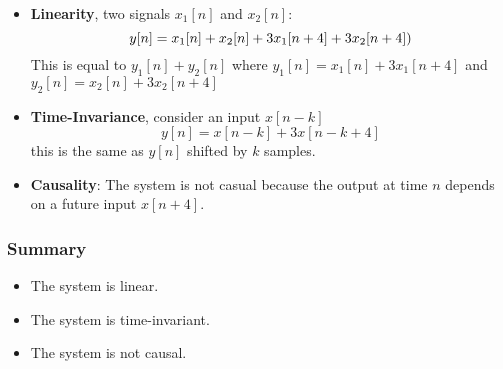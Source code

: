 \begin{itemize}
    \item \textbf{Linearity}, two signals $x_1[n]$ and $x_2[n]$:
    \subitem \begin{equation*} y[n] = x_{1}[n] + x_{2}[n] + 3x_{1}[n+4] + 3x_{2}[n+4])\\
          \end{equation*}
     This is equal to $y_1[n]+y_2[n]$ where $y_1[n]=x_1[n]+3x_1[n+4]$ and $y_2[n]=x_2[n]+3x_2[n+4]$

    \item \textbf{Time-Invariance}, consider an input $x[n-k]$
    \subitem \begin{equation*} y[n]= x[n-k]+3x[n-k+4] \end{equation*}
    \subitem this is the same as $y[n]$ shifted by $k$ samples.
    \item \textbf{Causality}: The system is not casual because the output at time $n$ depends on a future input $x[n+4]$.
\end{itemize}

\subsubsection*{Summary}
\begin{itemize}
    \item The system is linear.
    \item The system is time-invariant.
    \item The system is not causal.
\end{itemize}